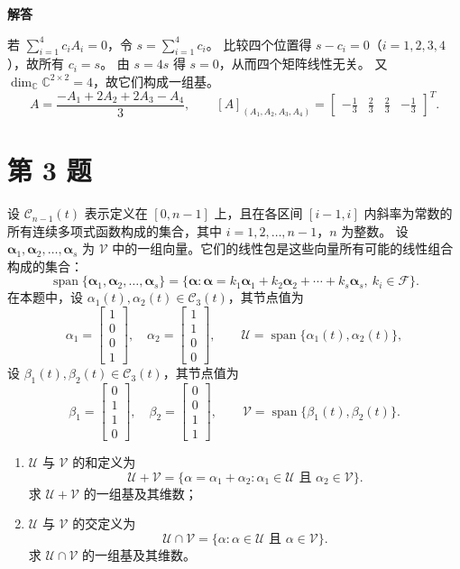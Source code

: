 \documentclass[UTF8,10pt,letterpaper,fontset=fandol]{ctexart}
\newcommand{\C}{\mathbb C}
\newcommand{\Span}{\operatorname{span}}
\newcommand{\Solution}{\par\Needspace{5\baselineskip}\textbf{解答}\par}
\begin{document}
\Solution
若 \(\sum_{i=1}^4 c_iA_i=0\)，令 \(s=\sum_{i=1}^4 c_i\)。
比较四个位置得 \(s-c_i=0\)（\(i=1,2,3,4\)），故所有 \(c_i=s\)。
由 \(s=4s\) 得 \(s=0\)，从而四个矩阵线性无关。
又 \(\dim_{\C}\C^{2\times2}=4\)，故它们构成一组基。
\[
A=\frac{-A_1+2A_2+2A_3-A_4}{3},\qquad
\boxed{[A]_{(A_1,A_2,A_3,A_4)}=
\begin{bmatrix}-\tfrac13&\tfrac23&\tfrac23&-\tfrac13\end{bmatrix}^{T}}.
\]

\section{第 3 题}
设 \(\mathcal C_{n-1}(t)\) 表示定义在 \([0,n-1]\) 上，且在各区间
\([i-1,i]\) 内斜率为常数的所有连续多项式函数构成的集合，其中
\(i=1,2,\ldots,n-1\)，\(n\) 为整数。
设 \(\boldsymbol\alpha_1,\boldsymbol\alpha_2,\ldots,\boldsymbol\alpha_s\)
为 \(\mathcal V\) 中的一组向量。它们的线性包是这些向量所有可能的线性组合构成的集合：
\[
\Span\{\boldsymbol\alpha_1,\boldsymbol\alpha_2,\ldots,\boldsymbol\alpha_s\}
=\{\boldsymbol\alpha:\boldsymbol\alpha=k_1\boldsymbol\alpha_1
+k_2\boldsymbol\alpha_2+\cdots+k_s\boldsymbol\alpha_s,\ k_i\in\mathcal F\}.
\]
在本题中，设 \(\alpha_1(t),\alpha_2(t)\in\mathcal C_3(t)\)，其节点值为
\[
\alpha_1=\begin{bmatrix}1\\0\\0\\1\end{bmatrix},\quad
\alpha_2=\begin{bmatrix}1\\1\\0\\0\end{bmatrix},\qquad
\mathcal U=\Span\{\alpha_1(t),\alpha_2(t)\},
\]
设 \(\beta_1(t),\beta_2(t)\in\mathcal C_3(t)\)，其节点值为
\[
\beta_1=\begin{bmatrix}0\\1\\1\\0\end{bmatrix},\quad
\beta_2=\begin{bmatrix}0\\0\\1\\1\end{bmatrix},\qquad
\mathcal V=\Span\{\beta_1(t),\beta_2(t)\}.
\]
\begin{enumerate}
\item \(\mathcal U\) 与 \(\mathcal V\) 的和定义为
\[
\mathcal U+\mathcal V
=\{\alpha=\alpha_1+\alpha_2:\alpha_1\in\mathcal U
\text{ 且 }\alpha_2\in\mathcal V\}.
\]
求 \(\mathcal U+\mathcal V\) 的一组基及其维数；
\item \(\mathcal U\) 与 \(\mathcal V\) 的交定义为
\[
\mathcal U\cap\mathcal V
=\{\alpha:\alpha\in\mathcal U\text{ 且 }\alpha\in\mathcal V\}.
\]
求 \(\mathcal U\cap\mathcal V\) 的一组基及其维数。
\end{enumerate}
\end{document}
